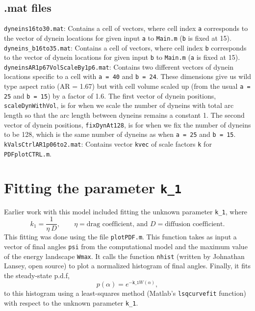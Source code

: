 \documentclass{article}
\begin{document}
\subsection{.mat files}
\noindent\texttt{dyneins16to30.mat}: Contains a cell of vectors, where cell index \texttt{a} corresponds to the vector of dynein locations for given input \texttt{a} to \texttt{Main.m} (\texttt{b} is fixed at 15). \\[3pt]

\noindent\texttt{dyneins\_b16to35.mat}: Contains a cell of vectors, where cell index \texttt{b} corresponds to the vector of dynein locations for given input \texttt{b} to \texttt{Main.m} (\texttt{a} is fixed at 15).\\[3pt]

\noindent\texttt{dyneinsAR1p67VolScaleBy1p6.mat}: Contains two different vectors of dynein locations specific to a cell with \texttt{a = 40} and \texttt{b = 24}. These dimensions give us wild type aspect ratio (AR = 1.67) but with cell volume scaled up (from the usual \texttt{a = 25} and \texttt{b = 15}) by a factor of 1.6. The first vector of dynein positions, \texttt{scaleDynWithVol}, is for when we scale the number of dyneins with total arc length so that the arc length between dyneins remains a constant 1. The second vector of dynein positions, \texttt{fixDynAt128}, is for when we fix the number of dyneins to be 128, which is the same number of dyneins as when \texttt{a = 25} and \texttt{b = 15}. \\[3pt]

\noindent\texttt{kValsCtrlAR1p06to2.mat}: Contains vector \texttt{kvec} of scale factors \texttt{k} for \texttt{PDFplotCTRL.m}.

\section{Fitting the parameter \texttt{k\_1}}
\label{fit}
Earlier work with this model included fitting the unknown parameter \texttt{k\_1}, where
\[
k_1 = \frac{1}{\eta \: D}, \qquad \eta = \text{drag coefficient, and }D = \text{diffusion coefficient.}
\]
This fitting was done using the file \texttt{plotPDF.m}. This function takes as input a vector of final angles \texttt{psi} from the computational model and the maximum value of the energy landscape \texttt{Wmax}. It calls the function \texttt{nhist} (written by Johnathan Lansey, open source) to plot a normalized histogram of final angles. Finally, it fits the steady-state p.d.f,
\[
p(\alpha) = e^{-\texttt{k\_1}W(\alpha)},
\] 
to this histogram using a least-squares method (Matlab's \texttt{lsqcurvefit} function) with respect to the unknown parameter \texttt{k\_1}.
\end{document}
